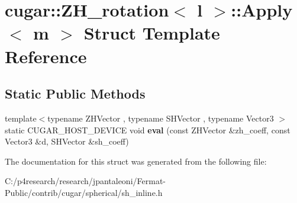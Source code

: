 \hypertarget{structcugar_1_1_z_h__rotation_1_1_apply}{}\section{cugar\+:\+:Z\+H\+\_\+rotation$<$ l $>$\+:\+:Apply$<$ m $>$ Struct Template Reference}
\label{structcugar_1_1_z_h__rotation_1_1_apply}
\subsection*{Static Public Methods}
\begin{DoxyCompactItemize}
\item 
\mbox{\label{structcugar_1_1_z_h__rotation_1_1_apply_a1d550d6576daa89f6a2d80fe6dd81f2b}} 
{\footnotesize template$<$typename Z\+H\+Vector , typename S\+H\+Vector , typename Vector3 $>$ }\\static C\+U\+G\+A\+R\+\_\+\+H\+O\+S\+T\+\_\+\+D\+E\+V\+I\+CE void {\bfseries eval} (const Z\+H\+Vector \&zh\+\_\+coeff, const Vector3 \&d, S\+H\+Vector \&sh\+\_\+coeff)
\end{DoxyCompactItemize}


The documentation for this struct was generated from the following file\+:\begin{DoxyCompactItemize}
\item 
C\+:/p4research/research/jpantaleoni/\+Fermat-\/\+Public/contrib/cugar/spherical/sh\+\_\+inline.\+h\end{DoxyCompactItemize}
